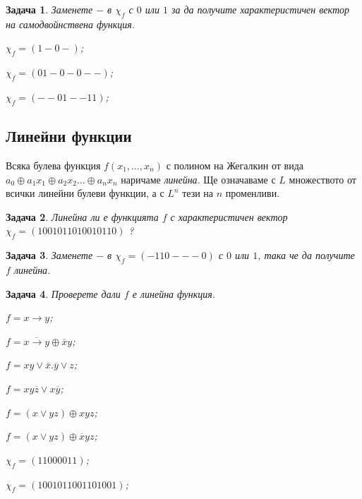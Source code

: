 \documentclass[a4paper]{article}
\newtheorem{problem}{Задача}
\newcommand{\xn}{x_{1},\dots,x_{n}}
\newcommand{\ov}[1]{\overline{#1}}
\begin{document}
\author{Stefan Vatev}


\begin{problem}
  Заменете $-$ в $\chi_f$ с $0$ или $1$ за да получите характеристичен вектор на самодвойнствена функция.\\
  \begin{inparaenum}[a)]
  \item
    $\chi_f = (1-0-)$;
  \item
    $\chi_f = (01-0-0--)$;
  \item
    $\chi_f = (--01--11)$;
  \end{inparaenum}
\end{problem}

\subsection{Линейни функции}

Всяка булева функция $f(\xn)$ с полином на Жегалкин от вида 
$a_0\oplus a_1x_1 \oplus a_2x_2 \dots\oplus a_nx_n$ наричаме {\em линейна}.
Ще означаваме с $L$ множеството от всички линейни булеви функции, а с $L^n$ тези на $n$ променливи.

\begin{problem}
  Линейна ли е функцията $f$ с характеристичен вектор $\chi_f = (1001011010010110)$ ?
\end{problem}

\begin{problem}
  Заменете $-$ в $\chi_f = (-110---0)$ с $0$ или $1$, така че да получите $f$ линейна.
\end{problem}


\begin{problem}
  Проверете дали $f$ е линейна функция.\\
  \begin{inparaenum}[a)]
  \item
    $f = x\rightarrow y$;
  \item
    $f = \ov{x\rightarrow y}\oplus \ov{x}y$;
  \item
    $f = xy\vee \ov{x}.\ov{y}\vee z$;
  \item
    $f = xy\ov{z}\vee x\ov{y}$;
  \item
    $f = (x\vee yz)\oplus xyz$;
  \item
    $f = (x\vee yz)\oplus \ov{x}yz$;
  \item
    $\chi_f = (1100 0011)$;
  \item
    $\chi_f = (1001 0110 0110 1001)$;
  \end{inparaenum}
\end{problem}
\end{document}
